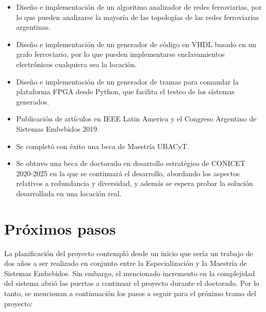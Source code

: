 	\begin{itemize}
		\item Diseño e implementación de un algoritmo analizador de redes ferroviarias, por lo que pueden analizarse la mayoría de las topologías de las redes ferroviarias argentinas.
		\item Diseño e implementación de un generador de código en VHDL basado en un grafo ferroviario, por lo que pueden implementarse enclavamientos electrónicos cualquiera sea la locación.
		\item Diseño e implementación de un generador de tramas para comandar la plataforma FPGA desde Python, que facilita el testeo de los sistemas generados.
		\item Publicación de artículos en IEEE Latin America y el Congreso Argentino de Sistemas Embebidos 2019\cite{IEEE_LAT}.
		\item Se completó con éxito una beca de Maestría UBACyT.
		\item Se obtuvo una beca de doctorado en desarrollo estratégico de CONICET 2020-2025 en la que se continuará el desarrollo, abordando los aspectos relativos a redundancia y diversidad, y además se espera probar la solución desarrollada en una locación real.
	\end{itemize}
	
\section{Próximos pasos}

	La planificación del proyecto contempló desde un inicio que sería un trabajo de dos años a ser realizado en conjunto entre la Especialización y la Maestría de Sistemas Embebidos. Sin embargo, el mencionado incremento en la complejidad del sistema abrió las puertas a continuar el proyecto durante el doctorado. Por lo tanto, se mencionan a continuación los pasos a seguir para el próximo tramo del proyecto:	
	
